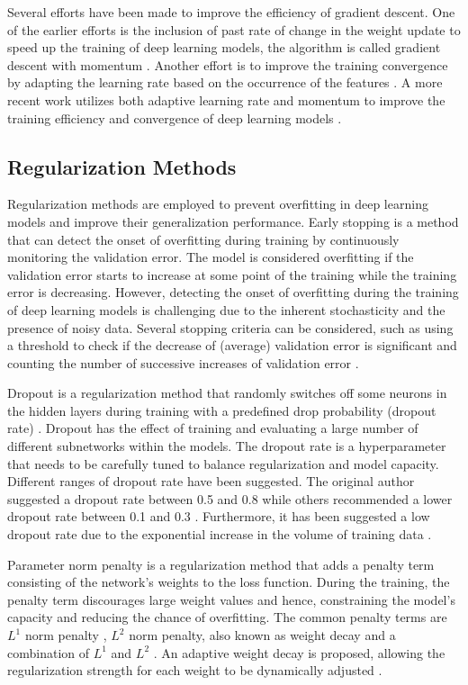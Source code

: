 \documentclass[preprint,12pt]{elsarticle}
\begin{document}
Several efforts have been made to improve the efficiency of gradient descent. One of the earlier efforts is the inclusion of past rate of change in the weight update to speed up the training of deep learning models, the algorithm is called gradient descent with momentum \citep{qian_momentum_1999}. Another effort is to improve the training convergence by adapting the learning rate based on the occurrence of the features \citep{duchi_adaptive_2011}. A more recent work utilizes both adaptive learning rate and momentum to improve the training efficiency and convergence of deep learning models \citep{kingma_adam_2017}. 

\subsection{Regularization Methods}
Regularization methods are employed to prevent overfitting in deep learning models and improve their generalization performance. Early stopping is a method that can detect the onset of overfitting during training by continuously monitoring the validation error. The model is considered overfitting if the validation error starts to increase at some point of the training while the training error is decreasing. However, detecting the onset of overfitting during the training of deep learning models is challenging due to the inherent stochasticity and the presence of noisy data. Several stopping criteria can be considered, such as using a threshold to check if the decrease of (average) validation error is significant and counting the number of successive increases of validation error \citep{prechelt_early_2012}.

Dropout is a regularization method that randomly switches off some neurons in the hidden layers during training with a predefined drop probability (dropout rate) \citep{srivastava_dropout_2014}. Dropout has the effect of training and evaluating a large number of different subnetworks within the models. The dropout rate is a hyperparameter that needs to be carefully tuned to balance regularization and model capacity. Different ranges of dropout rate have been suggested. The original author suggested a dropout rate between 0.5 and 0.8 \citep{srivastava_dropout_2014} while others recommended a lower dropout rate between 0.1 and 0.3 \citep{park_analysis_2017}. Furthermore, it has been suggested a low dropout rate due to the exponential increase in the volume of training data \citep{liu_dropout_2023}.

Parameter norm penalty is a regularization method that adds a penalty term consisting of the network’s weights to the loss function. During the training, the penalty term discourages large weight values and hence, constraining the model’s capacity and reducing the chance of overfitting. The common penalty terms are $L^1$ norm penalty \citep{tibshirani_regression_1996}, $L^2$ norm penalty, also known as weight decay and a combination of $L^1$ and $L^2$ \citep{zou_regularization_2005}. An adaptive weight decay is proposed, allowing the regularization strength for each weight to be dynamically adjusted \citep{nakamura_adaptive_2019}.
\end{document}

